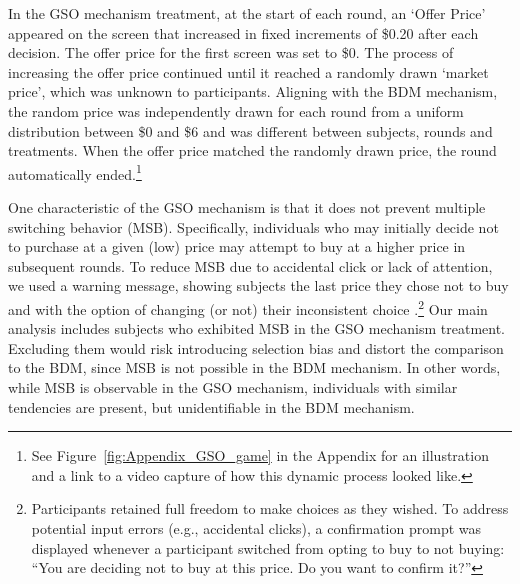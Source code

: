 \documentclass[12pt]{article}
\begin{document}
In the GSO mechanism treatment, at the start of each round, an `Offer Price' appeared on the screen that increased in fixed increments of \$0.20 after each decision. %
The offer price for the first screen was set to \$0. The process of increasing the offer price continued until it reached a randomly drawn `market price', which was unknown to participants. Aligning with the BDM mechanism, the random price was independently drawn for each round from a uniform distribution between \$0 and \$6 and was different between subjects, rounds and treatments. When the offer price matched the randomly drawn price, the round automatically ended.\footnote{See Figure~\ref{fig:Appendix_GSO_game} in the Appendix for an illustration and a link to a video capture of how this dynamic process looked like.} 



One characteristic of the GSO mechanism is that it does not prevent multiple switching behavior (MSB). Specifically, individuals who may initially decide not to purchase at a given (low) price may attempt to buy at a higher price in subsequent rounds. To reduce MSB due to accidental click or lack of attention, we used a warning message, showing subjects the last price they chose not to buy and with the option of changing (or not) their inconsistent choice \citep{yu2021multiple}.\footnote{Participants retained full freedom to make choices as they wished. To address potential input errors (e.g., accidental clicks), a confirmation prompt was displayed whenever a participant switched from opting to buy to not buying: ``You are deciding not to buy at this price. Do you want to confirm it?''} 
Our main analysis includes subjects who exhibited MSB in the GSO mechanism treatment. Excluding them would risk introducing selection bias and distort the comparison to the BDM, since MSB is not possible in the BDM mechanism. In other words, while MSB is observable in the GSO mechanism, individuals with similar tendencies are present, but unidentifiable in the BDM mechanism. 

    
\end{document}
